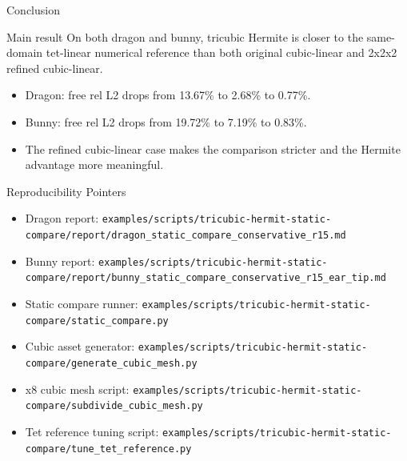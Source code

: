 \documentclass[aspectratio=169,10pt]{beamer}
\newcommand{\pct}[1]{#1\%}
\newcommand{\good}[1]{\textcolor{pgoGreen}{#1}}
\begin{document}
\begin{frame}{Conclusion}
  \small
  \begin{block}{Main result}
    On both dragon and bunny, tricubic Hermite is closer to the same-domain tet-linear numerical reference than both original cubic-linear and 2x2x2 refined cubic-linear.
  \end{block}

  \vspace{0.7em}
  \begin{itemize}
    \item Dragon: free rel L2 drops from \pct{13.67} to \pct{2.68} to \good{\pct{0.77}}.
    \item Bunny: free rel L2 drops from \pct{19.72} to \pct{7.19} to \good{\pct{0.83}}.
    \item The refined cubic-linear case makes the comparison stricter and the Hermite advantage more meaningful.
  \end{itemize}
\end{frame}

\begin{frame}{Reproducibility Pointers}
  \scriptsize
  \begin{itemize}
    \item Dragon report: \texttt{examples/scripts/tricubic-hermit-static-compare/report/dragon\_static\_compare\_conservative\_r15.md}
    \item Bunny report: \texttt{examples/scripts/tricubic-hermit-static-compare/report/bunny\_static\_compare\_conservative\_r15\_ear\_tip.md}
    \item Static compare runner: \texttt{examples/scripts/tricubic-hermit-static-compare/static\_compare.py}
    \item Cubic asset generator: \texttt{examples/scripts/tricubic-hermit-static-compare/generate\_cubic\_mesh.py}
    \item x8 cubic mesh script: \texttt{examples/scripts/tricubic-hermit-static-compare/subdivide\_cubic\_mesh.py}
    \item Tet reference tuning script: \texttt{examples/scripts/tricubic-hermit-static-compare/tune\_tet\_reference.py}
  \end{itemize}
\end{frame}
\end{document}
